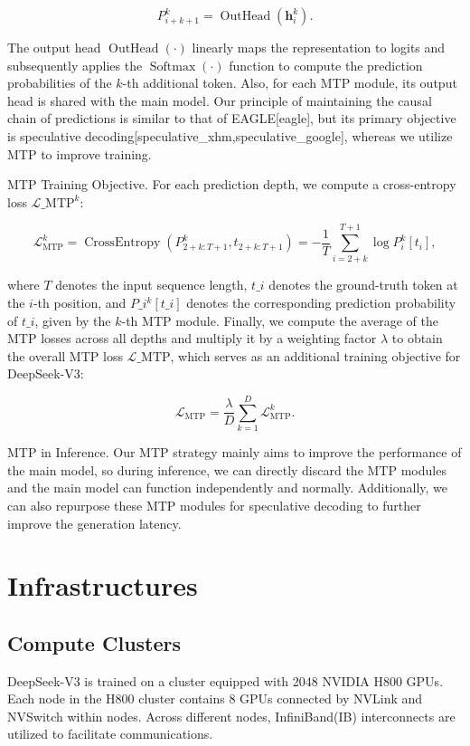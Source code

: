\documentclass[11pt,a4paper]{article}
\begin{document}
$$P_{i+k+1}^{k} = \operatorname{OutHead}(\mathbf{h}_{i}^{k}).$$

The output head $\operatorname{OutHead}(\cdot)$ linearly maps the representation to logits and subsequently applies the $\operatorname{Softmax}(\cdot)$ function to compute the prediction probabilities of the $k$-th additional token. 
Also, for each MTP module, its output head is shared with the main model. 
Our principle of maintaining the causal chain of predictions is similar to that of EAGLE[eagle], but its primary objective is speculative decoding[speculative\_xhm,speculative\_google], whereas we utilize MTP to improve training.

MTP Training Objective.
For each prediction depth, we compute a cross-entropy loss $\mathcal{L}\_{\text{MTP}}^{k}$:

$$\mathcal{L}_{\text{MTP}}^{k} = \operatorname{CrossEntropy}(P_{2 + k:T + 1}^{k}, t_{2 + k:T + 1}) = -\frac{1}{T} \sum_{i=2 + k}^{T + 1} \log P_i^k [t_i],$$

where $T$ denotes the input sequence length, $t\_i$ denotes the ground-truth token at the $i$-th position, and $P\_i^k [t\_i]$ denotes the corresponding prediction probability of $t\_i$, given by the $k$-th MTP module. 
Finally, we compute the average of the MTP losses across all depths and multiply it by a weighting factor $\lambda$ to obtain the overall MTP loss $\mathcal{L}\_{\text{MTP}}$, which serves as an additional training objective for DeepSeek-V3:

$$\mathcal{L}_{\text{MTP}} = \frac{\lambda}{D} \sum_{k=1}^{D} \mathcal{L}_{\text{MTP}}^{k}.$$

MTP in Inference.
Our MTP strategy mainly aims to improve the performance of the main model, so during inference, we can directly discard the MTP modules and the main model can function independently and normally.
Additionally, we can also repurpose these MTP modules for speculative decoding to further improve the generation latency.

\section{Infrastructures}

\subsection{Compute Clusters}

DeepSeek-V3 is trained on a cluster equipped with 2048 NVIDIA H800 GPUs. 
Each node in the H800 cluster contains 8 GPUs connected by NVLink and NVSwitch within nodes. 
Across different nodes, InfiniBand(IB) interconnects are utilized to facilitate communications.
\end{document}
